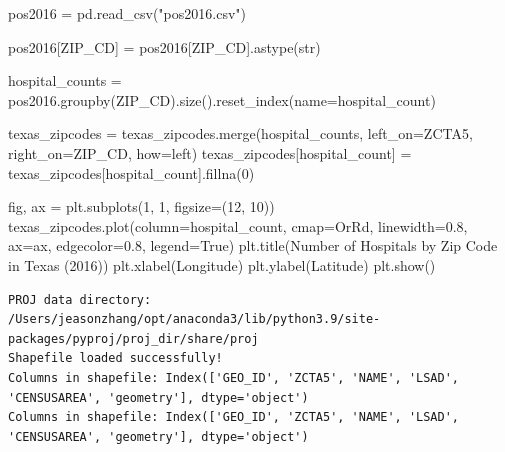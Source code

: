 \documentclass[
  letterpaper,
  DIV=11,
  numbers=noendperiod]{scrartcl}
\newenvironment{Shaded}{\begin{snugshade}}{\end{snugshade}}
\newcommand{\BuiltInTok}[1]{\textcolor[rgb]{0.00,0.23,0.31}{#1}}
\newcommand{\DecValTok}[1]{\textcolor[rgb]{0.68,0.00,0.00}{#1}}
\newcommand{\FloatTok}[1]{\textcolor[rgb]{0.68,0.00,0.00}{#1}}
\newcommand{\NormalTok}[1]{\textcolor[rgb]{0.00,0.23,0.31}{#1}}
\newcommand{\OperatorTok}[1]{\textcolor[rgb]{0.37,0.37,0.37}{#1}}
\newcommand{\StringTok}[1]{\textcolor[rgb]{0.13,0.47,0.30}{#1}}
\newcommand{\VariableTok}[1]{\textcolor[rgb]{0.07,0.07,0.07}{#1}}
\begin{document}
\begin{Shaded}
\begin{Highlighting}[]
\NormalTok{pos2016 }\OperatorTok{=}\NormalTok{ pd.read\_csv(}\StringTok{"pos2016.csv"}\NormalTok{)}

\NormalTok{pos2016[}\StringTok{\textquotesingle{}ZIP\_CD\textquotesingle{}}\NormalTok{] }\OperatorTok{=}\NormalTok{ pos2016[}\StringTok{\textquotesingle{}ZIP\_CD\textquotesingle{}}\NormalTok{].astype(}\BuiltInTok{str}\NormalTok{)}

\NormalTok{hospital\_counts }\OperatorTok{=}\NormalTok{ pos2016.groupby(}\StringTok{\textquotesingle{}ZIP\_CD\textquotesingle{}}\NormalTok{).size().reset\_index(name}\OperatorTok{=}\StringTok{\textquotesingle{}hospital\_count\textquotesingle{}}\NormalTok{)}

\NormalTok{texas\_zipcodes }\OperatorTok{=}\NormalTok{ texas\_zipcodes.merge(hospital\_counts, left\_on}\OperatorTok{=}\StringTok{\textquotesingle{}ZCTA5\textquotesingle{}}\NormalTok{, right\_on}\OperatorTok{=}\StringTok{\textquotesingle{}ZIP\_CD\textquotesingle{}}\NormalTok{, how}\OperatorTok{=}\StringTok{\textquotesingle{}left\textquotesingle{}}\NormalTok{)}
\NormalTok{texas\_zipcodes[}\StringTok{\textquotesingle{}hospital\_count\textquotesingle{}}\NormalTok{] }\OperatorTok{=}\NormalTok{ texas\_zipcodes[}\StringTok{\textquotesingle{}hospital\_count\textquotesingle{}}\NormalTok{].fillna(}\DecValTok{0}\NormalTok{)}

\NormalTok{fig, ax }\OperatorTok{=}\NormalTok{ plt.subplots(}\DecValTok{1}\NormalTok{, }\DecValTok{1}\NormalTok{, figsize}\OperatorTok{=}\NormalTok{(}\DecValTok{12}\NormalTok{, }\DecValTok{10}\NormalTok{))}
\NormalTok{texas\_zipcodes.plot(column}\OperatorTok{=}\StringTok{\textquotesingle{}hospital\_count\textquotesingle{}}\NormalTok{, cmap}\OperatorTok{=}\StringTok{\textquotesingle{}OrRd\textquotesingle{}}\NormalTok{, linewidth}\OperatorTok{=}\FloatTok{0.8}\NormalTok{, ax}\OperatorTok{=}\NormalTok{ax, edgecolor}\OperatorTok{=}\StringTok{\textquotesingle{}0.8\textquotesingle{}}\NormalTok{, legend}\OperatorTok{=}\VariableTok{True}\NormalTok{)}
\NormalTok{plt.title(}\StringTok{\textquotesingle{}Number of Hospitals by Zip Code in Texas (2016)\textquotesingle{}}\NormalTok{)}
\NormalTok{plt.xlabel(}\StringTok{\textquotesingle{}Longitude\textquotesingle{}}\NormalTok{)}
\NormalTok{plt.ylabel(}\StringTok{\textquotesingle{}Latitude\textquotesingle{}}\NormalTok{)}
\NormalTok{plt.show()}
\end{Highlighting}
\end{Shaded}

\begin{verbatim}
PROJ data directory: /Users/jeasonzhang/opt/anaconda3/lib/python3.9/site-packages/pyproj/proj_dir/share/proj
Shapefile loaded successfully!
Columns in shapefile: Index(['GEO_ID', 'ZCTA5', 'NAME', 'LSAD', 'CENSUSAREA', 'geometry'], dtype='object')
Columns in shapefile: Index(['GEO_ID', 'ZCTA5', 'NAME', 'LSAD', 'CENSUSAREA', 'geometry'], dtype='object')
\end{verbatim}
\end{document}
